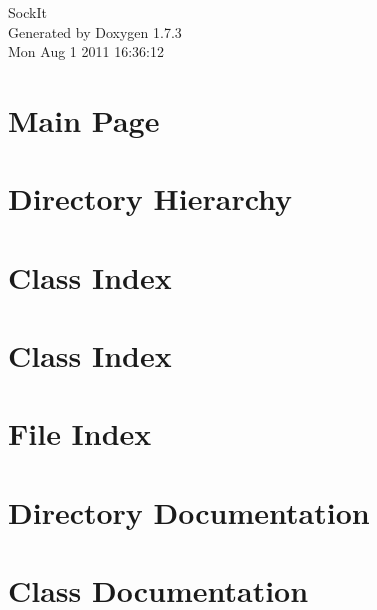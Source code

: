 \documentclass[a4paper]{book}
\begin{document}
\hypersetup{pageanchor=false}
\begin{titlepage}
\vspace*{7cm}
\begin{center}
{\Large SockIt }\\
\vspace*{1cm}
{\large Generated by Doxygen 1.7.3}\\
\vspace*{0.5cm}
{\small Mon Aug 1 2011 16:36:12}\\
\end{center}
\end{titlepage}
\clearemptydoublepage
{}
\tableofcontents
\clearemptydoublepage
{}
\hypersetup{pageanchor=true}
\chapter{Main Page}
\label{index}\hypertarget{index}{}
\chapter{Directory Hierarchy}

\chapter{Class Index}

\chapter{Class Index}

\chapter{File Index}

\chapter{Directory Documentation}







\chapter{Class Documentation}

















\end{document}
